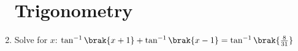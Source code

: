 \begin{enumerate}
\section*{Trigonometry}
\item Solve for $x$:
$\tan^{-1}\brak{x+1} + \tan^{-1}\brak{x-1} = \tan^{-1}\brak{\frac{8}{31}}$        
\end{enumerate}
